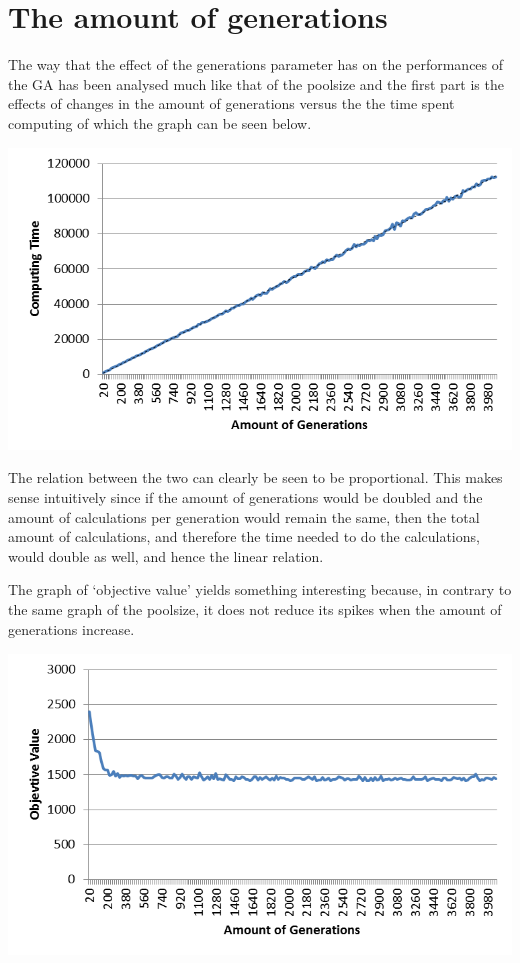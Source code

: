 \section{The amount of generations}

\par
The way that the effect of the generations parameter has on the performances of the GA has been analysed much like that of the poolsize and the first part is the effects of changes in the amount of generations versus the the time spent computing of which the graph can be seen below.
\begin{centering}
	\includegraphics[height=8cm]{CTG}
\end{centering}
\par
The relation between the two can clearly be seen to be proportional. This makes sense intuitively since if the amount of generations would be doubled and the amount of calculations per generation would remain the same, then the total amount of calculations, and therefore the time needed to do the calculations, would double as well, and hence the linear relation.
\par
The graph of ‘objective value’ yields something interesting because, in contrary to the same graph of the poolsize, it does not reduce its spikes when the amount of generations increase.

	\includegraphics[height=8cm]{OVG}

